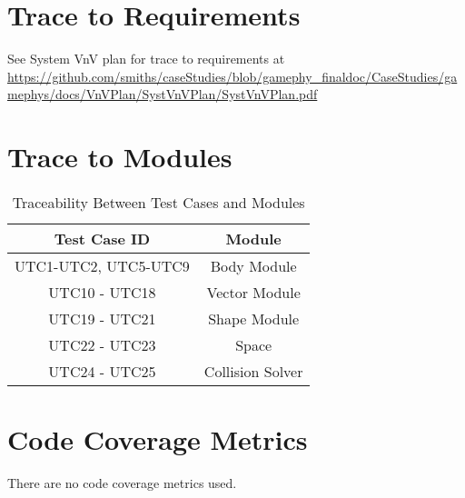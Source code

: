 \documentclass[12pt, titlepage]{article}
\begin{document}
\section{Trace to Requirements}
See System VnV plan for trace to requirements at \url{https://github.com/smiths/caseStudies/blob/gamephy_finaldoc/CaseStudies/gamephys/docs/VnVPlan/SystVnVPlan/SystVnVPlan.pdf}
\newpage	
\section{Trace to Modules}		

\begin{table} [h!]
	
	\centering
	
	\begin{tabular}{|c|c|}
		
		\hline	
		
		\textbf{Test Case ID} & \textbf{Module}\\
		
		\hline 
		
		
		UTC1-UTC2, UTC5-UTC9& Body Module\\ \hline
		
		UTC10 - UTC18& Vector  Module\\ \hline
		
		UTC19 - UTC21&  Shape Module\\ \hline
		
		UTC22 - UTC23& Space\\ \hline
		
		UTC24 - UTC25 & Collision Solver\\ \hline
		
	\end{tabular}
	
	\caption{Traceability Between Test Cases and Modules}
	
	\label{Table:Traceability} 
	
\end{table}

\section{Code Coverage Metrics}
There are no code coverage metrics used.



\end{document}
